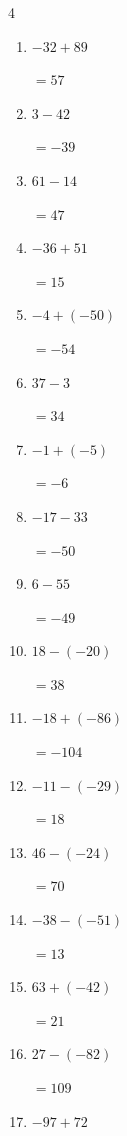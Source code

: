 \begin{multicols}{4}
\begin{enumerate}
        $=29$

  \item $-32+89$

        $=57$

  \item $3-42$

        $=-39$

  \item $61-14$

        $=47$

  \item $-36+51$

        $=15$

  \item $-4+(-50)$

        $=-54$

  \item $37-3$

        $=34$

  \item $-1+(-5)$

        $=-6$

  \item $-17-33$

        $=-50$

  \item $6-55$

        $=-49$

  \item $18-(-20)$

        $=38$

  \item $-18+(-86)$

        $=-104$

  \item $-11-(-29)$

        $=18$

  \item $46-(-24)$

        $=70$

  \item $-38-(-51)$

        $=13$

\columnbreak %

  \item $63+(-42)$

        $=21$

  \item $27-(-82)$

        $=109$

  \item $-97+72$


\end{enumerate}
\end{multicols}
